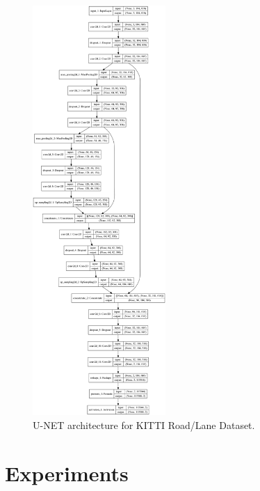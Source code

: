 \documentclass[10pt,twocolumn,letterpaper]{article}
\begin{document}
\begin{figure}[ht]
  \centering
  \includegraphics[width=0.45\textwidth]{kitti_unet_plot.png}
  \caption{U-NET architecture for KITTI Road/Lane Dataset.}
  \label{fig:vgg16}
\end{figure}

\section{Experiments} \label{sec:experiments}

\end{document}
